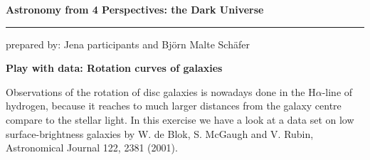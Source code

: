 \documentclass[a4paper,12pt]{article}
\newcommand{\HRule}{\rule{\linewidth}{0.3mm}}
\begin{document}
\pagestyle{empty}

\begin{center}
\LARGE \textbf{Astronomy from 4 Perspectives: the Dark Universe}
\HRule
\end{center}
\begin{flushright}
prepared by: Jena participants and Bj{\"o}rn Malte Sch{\"a}fer
\end{flushright}
\begin{center}
{\Large \textbf{Play with data: Rotation curves of galaxies}}
\end{center}
\vspace{5mm}

\noindent
Observations of the rotation of disc galaxies is nowadays done in the H$\alpha$-line of hydrogen, because it reaches to much larger distances from the galaxy centre compare to the stellar light. In this exercise we have a look at a data set on low surface-brightness galaxies by W. de Blok, S. McGaugh and V. Rubin, Astronomical Journal 122, 2381 (2001).
\end{document}
